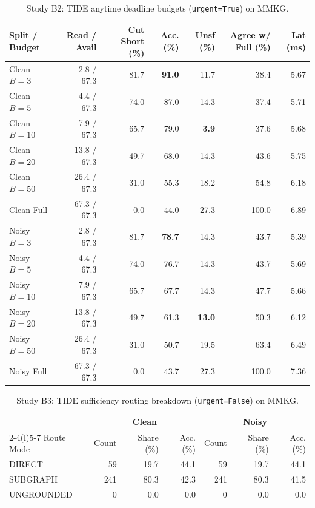 \documentclass[12pt,a4paper,oneside]{report}
\newcommand{\code}[1]{\texttt{\small #1}}
\begin{document}
\begin{table}[H]
\centering
\caption{Study B2: TIDE anytime deadline budgets (\code{urgent=True}) on MMKG.}
\label{tab:mmkg_b2}
\small
\setlength{\tabcolsep}{3.5pt}
\begin{tabular}{@{}l rrrrrr@{}}
\toprule
Split / Budget & Read / Avail & Cut Short (\%) & Acc. (\%) & Unsf (\%) & Agree w/ Full (\%) & Lat (ms)\\
\midrule
Clean $B=3$ & 2.8 / 67.3 & 81.7 & \textbf{91.0} & 11.7 & 38.4 & 5.67\\
Clean $B=5$ & 4.4 / 67.3 & 74.0 & 87.0 & 14.3 & 37.4 & 5.71\\
Clean $B=10$ & 7.9 / 67.3 & 65.7 & 79.0 & \textbf{3.9} & 37.6 & 5.68\\
Clean $B=20$ & 13.8 / 67.3 & 49.7 & 68.0 & 14.3 & 43.6 & 5.75\\
Clean $B=50$ & 26.4 / 67.3 & 31.0 & 55.3 & 18.2 & 54.8 & 6.18\\
Clean Full & 67.3 / 67.3 & 0.0 & 44.0 & 27.3 & 100.0 & 6.89\\
\midrule
Noisy $B=3$ & 2.8 / 67.3 & 81.7 & \textbf{78.7} & 14.3 & 43.7 & 5.39\\
Noisy $B=5$ & 4.4 / 67.3 & 74.0 & 76.7 & 14.3 & 43.7 & 5.69\\
Noisy $B=10$ & 7.9 / 67.3 & 65.7 & 67.7 & 14.3 & 47.7 & 5.66\\
Noisy $B=20$ & 13.8 / 67.3 & 49.7 & 61.3 & \textbf{13.0} & 50.3 & 6.12\\
Noisy $B=50$ & 26.4 / 67.3 & 31.0 & 50.7 & 19.5 & 63.4 & 6.49\\
Noisy Full & 67.3 / 67.3 & 0.0 & 43.7 & 27.3 & 100.0 & 7.36\\
\bottomrule
\end{tabular}
\end{table}

\begin{table}[H]
\centering
\caption{Study B3: TIDE sufficiency routing breakdown (\code{urgent=False}) on MMKG.}
\label{tab:mmkg_b3}
\small
\begin{tabular}{@{}l rrr rrr@{}}
\toprule
& \multicolumn{3}{c}{Clean} & \multicolumn{3}{c}{Noisy}\\
\cmidrule(lr){2-4}\cmidrule(l){5-7}
Route Mode & Count & Share (\%) & Acc. (\%) & Count & Share (\%) & Acc. (\%)\\
\midrule
DIRECT & 59 & 19.7 & 44.1 & 59 & 19.7 & 44.1\\
SUBGRAPH & 241 & 80.3 & 42.3 & 241 & 80.3 & 41.5\\
UNGROUNDED & 0 & 0.0 & 0.0 & 0 & 0.0 & 0.0\\
\bottomrule
\end{tabular}
\end{table}
\end{document}
